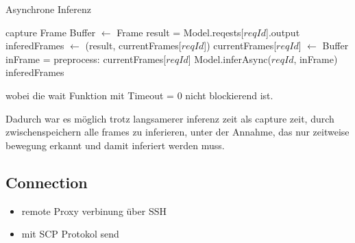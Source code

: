 \begin{algorithm}[H]
    \caption{Asynchrone Inferenz}
    \begin{algorithmic}
    \WHILE{\TRUE}
        \STATE capture Frame
            \STATE Buffer $\leftarrow$ Frame
        \ENDIF
                \STATE result = Model.reqests[$reqId$].output
                \STATE inferedFrames $\leftarrow$ (result, currentFrames[$reqId$])
                    \STATE currentFrames[$reqId$] $\leftarrow$ Buffer 
                    \STATE inFrame = preprocess: currentFrames[$reqId$]
                    \STATE Model.inferAsync($reqId$, inFrame)
                \ENDIF
            \ENDIF
        \ENDFOR
        \RETURN inferedFrames
    \ENDWHILE
    \end{algorithmic}
\end{algorithm}

wobei die wait Funktion mit Timeout = 0 nicht blockierend ist.

Dadurch war es möglich trotz langsamerer inferenz zeit als 
capture zeit, durch zwischenspeichern alle frames zu inferieren, 
unter der Annahme, das nur zeitweise bewegung erkannt und damit 
inferiert werden muss.



\subsection*{Connection}

\begin{itemize}
    \item remote Proxy verbinung über SSH
    \item mit SCP Protokol send
\end{itemize}





